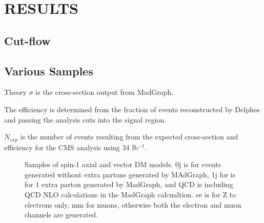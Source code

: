 \documentclass[12pt,A4paper]{article}
\begin{document}
\section{RESULTS}
\subsection{Cut-flow}


\subsection{Various Samples}

Theory \(\sigma\) is the cross-section output from MadGraph.

The efficiency is determined from the fraction of events reconstructed by Delphes and passing the analysis cuts into the signal region.

\(N_{exp}\) is the number of events resulting from the expected cross-section and efficiency for the CMS analysis using 34 fb\(^{-1}\).

\begin{figure}
\begin{center}
\caption{Samples of spin-1 axial and vector DM models. 0j is for
  events generated without extra partons generated by MAdGraph, 1j for
  is for 1 extra parton generated by MadGraph, and QCD is including
  QCD NLO calculations in the MadGraph calcualtion. ee is for Z to
  electrons only, mm for muons, otherwise both the electron and muon
  channels are generated.}
\end{center}
\end{figure}
\end{document}
